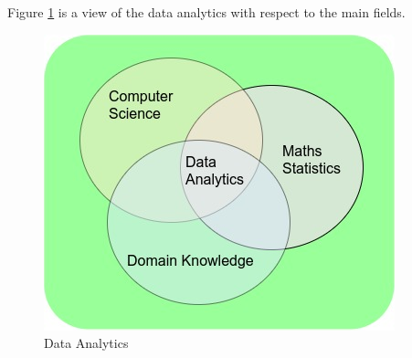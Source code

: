 Figure \ref{fig:data-analytics} is a view of the data analytics with respect to the main fields.

\begin{figure}[H]
	\includegraphics[scale = 0.8]{figures/FlowChart.jpg}
	\centering
	\caption{Data Analytics}
	\label{fig:data-analytics}
\end{figure}
\FloatBarrier

\newpage
